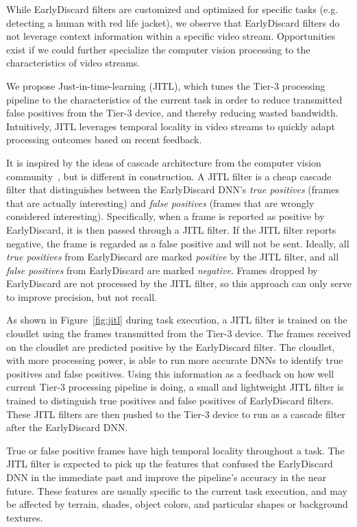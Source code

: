 While EarlyDiscard filters are customized and optimized for specific tasks (e.g.
detecting a human with red life jacket), we observe that EarlyDiscard filters do
not leverage context information within a specific video stream. Opportunities
exist if we could further specialize the computer vision processing to the
characteristics of video streams.

We propose Just-in-time-learning  (JITL), which tunes the Tier-3 processing
pipeline to the characteristics of the current task in order to reduce
transmitted false positives from the Tier-3 device, and thereby reducing wasted
bandwidth.  Intuitively, JITL leverages temporal locality in video streams to
quickly adapt processing outcomes based on recent feedback. 

It is inspired by the ideas of cascade architecture from the computer vision
community~\cite{Viola2001}, but is different in construction. A JITL filter is a
cheap cascade filter that distinguishes between the EarlyDiscard DNN's
\emph{true positives} (frames that are actually interesting) and \emph{false
positives} (frames that are wrongly considered interesting). Specifically, when
a frame is reported as positive by EarlyDiscard, it is then passed through a
JITL filter. If the JITL filter reports negative, the frame is regarded as a
false positive and will not be sent. Ideally, all \emph{true positives} from
EarlyDiscard are marked \emph{positive} by the JITL filter, and all \emph{false
positives} from EarlyDiscard are marked \emph{negative}.  Frames dropped by
EarlyDiscard are not processed by the JITL filter, so this approach can only
serve to improve precision, but not recall.

As shown in Figure~\ref{fig:jitl} during task execution, a JITL filter is
trained on the cloudlet using the frames transmitted from the Tier-3 device.
The frames received on the cloudlet are predicted positive by the EarlyDiscard
filter. The cloudlet, with more processing power, is able to run more accurate
DNNs to identify true positives and false positives. Using this information as a
feedback on how well current Tier-3 processing pipeline is doing, a small and
lightweight JITL filter is trained to distinguish true positives and false
positives of EarlyDiscard filters. These JITL filters are then pushed to the
Tier-3 device to run as a cascade filter after the EarlyDiscard DNN.

True or false positive frames have high temporal locality throughout a task. The
JITL filter is expected to pick up the features that confused the EarlyDiscard
DNN in the immediate past and improve the pipeline's accuracy in the near
future. These features are usually specific to the current task execution, and
may be affected by terrain, shades, object colors, and particular shapes or
background textures.

